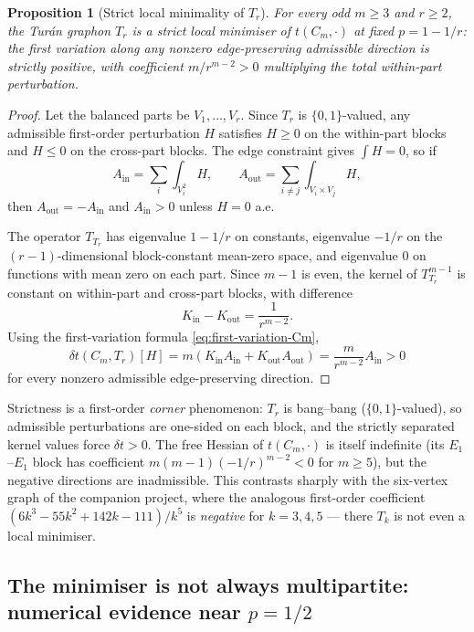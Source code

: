 \documentclass[11pt]{article}
\newtheorem{proposition}[theorem]{Proposition}
\begin{document}
\begin{proposition}[Strict local minimality of $T_r$]\label{prop:stability}
For every odd $m\ge3$ and $r\ge2$, the Tur\'an graphon $T_r$ is a strict local minimiser of $t(C_m,\cdot)$ at fixed $p=1-1/r$: the first variation along any nonzero edge-preserving admissible direction is strictly positive, with coefficient $m/r^{m-2}>0$ multiplying the total within-part perturbation.
\end{proposition}

\begin{proof}
Let the balanced parts be $V_1,\ldots,V_r$.  Since $T_r$ is $\{0,1\}$-valued, any admissible first-order perturbation $H$ satisfies $H\ge0$ on the within-part blocks and $H\le0$ on the cross-part blocks.  The edge constraint gives $\int H=0$, so if
\[
        A_{\mathrm{in}}=\sum_i\int_{V_i^2}H,
        \qquad
        A_{\mathrm{out}}=\sum_{i\ne j}\int_{V_i\times V_j}H,
\]
then $A_{\mathrm{out}}=-A_{\mathrm{in}}$ and $A_{\mathrm{in}}>0$ unless $H=0$ a.e.

The operator $T_{T_r}$ has eigenvalue $1-1/r$ on constants, eigenvalue $-1/r$ on the $(r-1)$-dimensional block-constant mean-zero space, and eigenvalue $0$ on functions with mean zero on each part.  Since $m-1$ is even, the kernel of $T_{T_r}^{m-1}$ is constant on within-part and cross-part blocks, with difference
\[
        K_{\mathrm{in}}-K_{\mathrm{out}}=\frac1{r^{m-2}}.
\]
Using the first-variation formula \eqref{eq:first-variation-Cm},
\[
        \delta t(C_m,T_r)[H]
        =m(K_{\mathrm{in}}A_{\mathrm{in}}+K_{\mathrm{out}}A_{\mathrm{out}})
        =\frac{m}{r^{m-2}}A_{\mathrm{in}}>0
\]
for every nonzero admissible edge-preserving direction.
\end{proof}

Strictness is a first-order \emph{corner} phenomenon: $T_r$ is bang--bang ($\{0,1\}$-valued), so admissible perturbations are one-sided on each block, and the strictly separated kernel values force $\delta t>0$.  The free Hessian of $t(C_m,\cdot)$ is itself indefinite (its $E_1$--$E_1$ block has coefficient $m(m-1)(-1/r)^{m-2}<0$ for $m\ge5$), but the negative directions are inadmissible.  This contrasts sharply with the six-vertex graph of the companion project, where the analogous first-order coefficient $(6k^3-55k^2+142k-111)/k^5$ is \emph{negative} for $k=3,4,5$ --- there $T_k$ is not even a local minimiser.

\subsection{The minimiser is not always multipartite: numerical evidence near $p=1/2$}\label{subsec:C13-minimiser}
\end{document}
